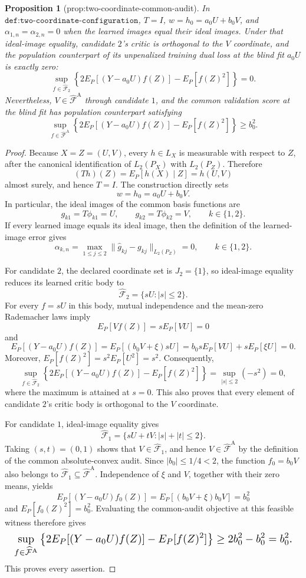 \documentclass{article}
\newtheorem{proposition}{Proposition}
\begin{document}
\begin{proposition}[prop:two-coordinate-common-audit]\label{prop:two-coordinate-common-audit}
In \(\texttt{def:two-coordinate-configuration}\), \(T=I\), \(w=h_0=a_0U+b_0V\), and \(\alpha_{1,n}=\alpha_{2,n}=0\) when the learned images equal their ideal images. Under that ideal-image equality, candidate \(2\)'s critic is orthogonal to the \(V\) coordinate, and the population counterpart of its unpenalized training dual loss at the blind fit \(a_0U\) is exactly zero: \[\sup_{f\in\widehat{\mathcal F}_2}\left\{2E_P[(Y-a_0U)f(Z)]-E_P[f(Z)^2]\right\}=0.\] Nevertheless, \(V\in\widehat{\mathcal F}^{\mathrm A}\) through candidate \(1\), and the common validation score at the blind fit has population counterpart satisfying \[\sup_{f\in\widehat{\mathcal F}^{\mathrm A}}\left\{2E_P[(Y-a_0U)f(Z)]-E_P[f(Z)^2]\right\}\ge b_0^2.\]
\end{proposition}
\begin{proof}
Because \(X=Z=(U,V)\), every \(h\in L_X\) is measurable with respect to \(Z\), after the canonical identification of \(L_2(P_X)\) with \(L_2(P_Z)\). Therefore
\[
 (Th)(Z)=E_P[h(X)\mid Z]=h(U,V)
\]
almost surely, and hence \(T=I\). The construction directly sets
\[
 w=h_0=a_0U+b_0V.
\]
In particular, the ideal images of the common basis functions are
\[
 g_{k1}=T\phi_{k1}=U,
 \qquad
 g_{k2}=T\phi_{k2}=V,
 \qquad k\in\{1,2\}.
\]
If every learned image equals its ideal image, then the definition of the learned-image error gives
\[
 \alpha_{k,n}
 =\max_{1\le j\le 2}\|\widehat g_{kj}-g_{kj}\|_{L_2(P_Z)}
 =0,
 \qquad k\in\{1,2\}.
\]

For candidate \(2\), the declared coordinate set is \(J_2=\{1\}\), so ideal-image equality reduces its learned critic body to
\[
 \widehat{\mathcal F}_2=\{sU:|s|\le2\}.
\]
For every \(f=sU\) in this body, mutual independence and the mean-zero Rademacher laws imply
\[
 E_P[Vf(Z)]=sE_P[VU]=0
\]
and
\[
 E_P[(Y-a_0U)f(Z)]
 =E_P[(b_0V+\xi)sU]
 =b_0sE_P[VU]+sE_P[\xi U]
 =0.
\]
Moreover, \(E_P[f(Z)^2]=s^2E_P[U^2]=s^2\). Consequently,
\[
 \sup_{f\in\widehat{\mathcal F}_2}
 \left\{2E_P[(Y-a_0U)f(Z)]-E_P[f(Z)^2]\right\}
 =\sup_{|s|\le2}(-s^2)
 =0,
\]
where the maximum is attained at \(s=0\). This also proves that every element of candidate \(2\)'s critic body is orthogonal to the \(V\) coordinate.

For candidate \(1\), ideal-image equality gives
\[
 \widehat{\mathcal F}_1
 =\{sU+tV:|s|+|t|\le2\}.
\]
Taking \((s,t)=(0,1)\) shows that \(V\in\widehat{\mathcal F}_1\), and hence \(V\in\widehat{\mathcal F}^{\mathrm A}\) by the definition of the common absolute-convex audit. Since \(|b_0|\le1/4<2\), the function \(f_0=b_0V\) also belongs to \(\widehat{\mathcal F}_1\subseteq\widehat{\mathcal F}^{\mathrm A}\). Independence of \(\xi\) and \(V\), together with their zero means, yields
\[
 E_P[(Y-a_0U)f_0(Z)]
 =E_P[(b_0V+\xi)b_0V]
 =b_0^2
\]
and \(E_P[f_0(Z)^2]=b_0^2\). Evaluating the common-audit objective at this feasible witness therefore gives
\[
\makebox[\linewidth][c]{\resizebox{0.98\linewidth}{!}{\(\displaystyle \sup_{f\in\widehat{\mathcal F}^{\mathrm A}}
 \left\{2E_P[(Y-a_0U)f(Z)]-E_P[f(Z)^2]\right\}
 \ge 2b_0^2-b_0^2
 =b_0^2.\)}}
\]
This proves every assertion.
\end{proof}
\end{document}
